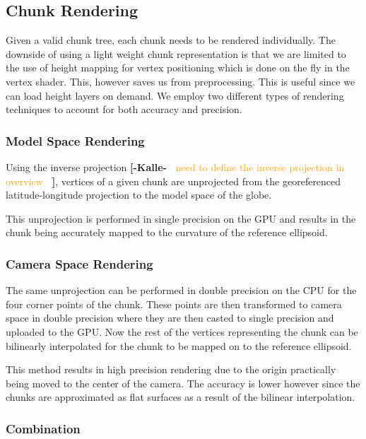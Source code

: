 \documentclass[journal]{vgtc}                %
\newcommand{\kallecomment}[1]{\textbf{[-Kalle-~}
    \textcolor{orange}{#1}
    \textbf{~]}}
\begin{document}
\subsection{Chunk Rendering}

Given a valid chunk tree, each chunk needs to be rendered individually.
The downside of using a light weight chunk representation is that we are limited to the use of height mapping for vertex positioning which is done on the fly in the vertex shader.
This, however saves us from preprocessing.
This is useful since we can load height layers on demand.
We employ two different types of rendering techniques to account for both accuracy and precision.

\subsubsection{Model Space Rendering}

Using the inverse projection \kallecomment{need to define the inverse projection in overview}, vertices of a given chunk are unprojected from the georeferenced latitude-longitude projection to the model space of the globe.

This unprojection is performed in single precision on the GPU and results in the chunk being accurately mapped to the curvature of the reference ellipsoid.
 
\subsubsection{Camera Space Rendering}

The same unprojection can be performed in double precision on the CPU for the four corner points of the chunk.
These points are then transformed to camera space in double precision where they are then casted to single precision and uploaded to the GPU.
Now the rest of the vertices representing the chunk can be bilinearly interpolated for the chunk to be mapped on to the reference ellipsoid.

This method results in high precision rendering due to the origin practically being moved to the center of the camera.
The accuracy is lower however since the chunks are approximated as flat surfaces as a result of the bilinear interpolation.

\subsubsection{Combination}
\end{document}
